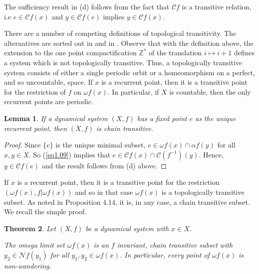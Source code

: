\documentclass[12pt]{amsart}
\newtheorem{theo}{{\bfseries Theorem}}[section]
\newtheorem{lem}[theo]{{\bfseries Lemma}}
\def \Z {\mathbb Z}
\def \CC {\mathcal C}
\def \NN {\mathcal N}
\def \a {\alpha }
\def \om {\omega}
\numberwithin{equation}{section}
\begin{document}
 The sufficiency result in (d) follows from the fact that $\CC f$ is a transitive relation, i.e $e \in \CC f(x)$ and $y \in \CC f(e)$ implies  $y \in \CC f(x)$.

 There are a number of competing definitions of topological transitivity. The alternatives are sorted out in \cite{AC12} and in \cite{BK14}.
Observe that with the definition above, the extension to the one point compactification  $\Z^*$ of the translation $i \mapsto i+1$
defines a system which is not topologically transitive. Thus, a topologically transitive system consists of either
a single periodic orbit or a homeomorphism on a perfect, and so uncountable, space. If $x$ is a recurrent point, then it is a transitive point
for the restriction of $f$ on $\om f(x)$. In particular, if $X$ is countable, then the only recurrent points are periodic. \vspace{.25cm}

\begin{lem}\label{lem1.01a} If a dynamical system $(X,f)$ has a fixed point $e$ as the unique recurrent point, then
$(X,f)$ is chain transitive. \end{lem}

\begin{proof} Since $\{ e \}$ is the unique minimal subset, $e \in \om f(x) \cap \a f(y)$ for all $x, y \in X$. So
(\ref{eq1.09}) implies that $e \in \CC f(x) \cap \CC (f^{-1})(y)$. Hence, $y \in \CC f(e)$ and the result follows from (d) above.
\end{proof}\vspace{.25cm}

If $x$ is a recurrent point, then it is a transitive point for the restriction $(\om f(x), f|\om f(x))$ and so in that case $\om f(x)$ is
a topologically transitive subset. As noted in \cite{A93} Proposition 4.14, it is, in any case, a chain transitive subset. We recall the simple proof.

\begin{theo}\label{theo1.02} Let $(X,f)$ be a dynamical system with $x \in X$.\vspace{.25cm}

The omega limit set $\om f(x)$ is an $f$ invariant, chain transitive subset with $y_2 \in  \NN f(y_1)$ for all
$y_1, y_2 \in \om f(x)$.  In particular, every point of $\om f(x)$ is non-wandering. \end{theo}
\end{document}
